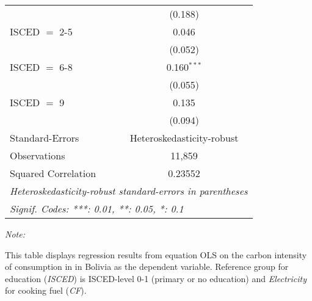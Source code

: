 \begin{table}[htbp!]
\begin{adjustbox}{width = 1\textwidth, max height = 0.95\textheight, center}
\begin{threeparttable}[b]
\begin{tabular}{lc}
                                & (0.188)\\   
            ISCED $=$ 2-5       & 0.046\\   
                                & (0.052)\\   
            ISCED $=$ 6-8       & 0.160$^{***}$\\   
                                & (0.055)\\   
            ISCED $=$ 9         & 0.135\\   
                                & (0.094)\\   
            \midrule 
            Standard-Errors     & Heteroskedasticity-robust \\   
            Observations        & 11,859\\  
            Squared Correlation & 0.23552\\  
            \midrule \midrule
            \multicolumn{2}{l}{\emph{Heteroskedasticity-robust standard-errors in parentheses}}\\
            \multicolumn{2}{l}{\emph{Signif. Codes: ***: 0.01, **: 0.05, *: 0.1}}\\
         \end{tabular}
         
         \begin{tablenotes}\item \medskip \textit{Note:}
            \item This table displays regression results from equation OLS on the carbon intensity of consumption in  in Bolivia as the dependent variable. Reference group for education (\textit{ISCED}) is ISCED-level 0-1 (primary or no education) and \textit{Electricity} for cooking fuel (\textit{CF}).
         \end{tablenotes}
      \end{threeparttable}
   \end{adjustbox}
\end{table}


